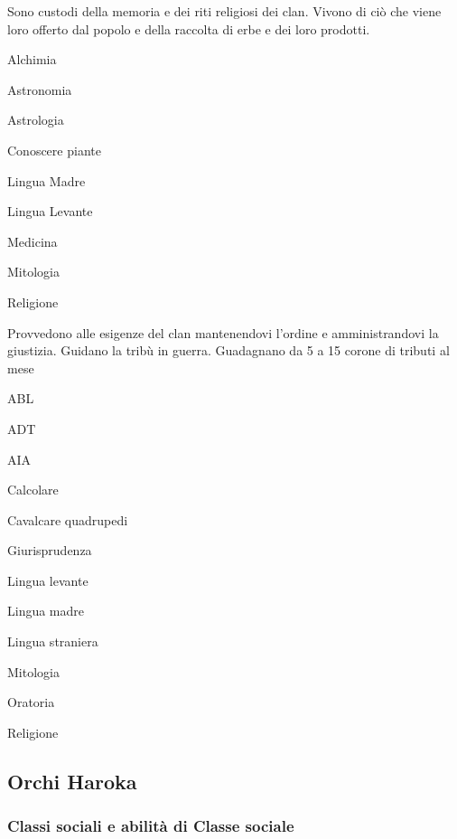 
Sono custodi della memoria e dei riti religiosi dei clan. Vivono di
ci\`o che viene loro offerto dal popolo e della raccolta di erbe e
dei loro prodotti.

\begin{abilist}
\item Alchimia
\item Astronomia
\item Astrologia
\item Conoscere piante
\item Lingua Madre
\item Lingua Levante
\item Medicina
\item Mitologia
\item Religione
\end{abilist}


Provvedono alle esigenze del clan mantenendovi l'ordine e
amministrandovi la giustizia. Guidano la trib\`u in guerra.
Guadagnano da 5 a 15 corone di tributi al mese

\begin{abilist}
\item ABL
\item ADT
\item AIA
\item Calcolare
\item Cavalcare quadrupedi
\item Giurisprudenza
\item Lingua levante
\item Lingua madre
\item Lingua straniera
\item Mitologia
\item Oratoria
\item Religione
\end{abilist}

\subsection{Orchi Haroka}
\minmaxorchi

\subsubsection{Classi sociali e abilit\`a di Classe sociale}


